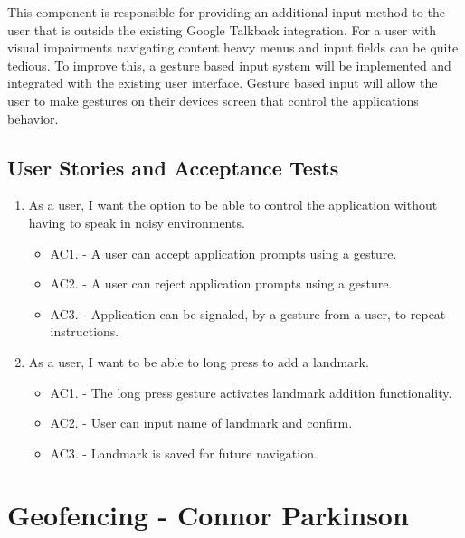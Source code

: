 \documentclass{scrreprt}
\begin{document}
This component is responsible for providing an additional input method to the user that
is outside the existing Google Talkback integration. For a user with visual impairments
navigating content heavy menus and input fields can be quite tedious. To improve this,
a gesture based input system will be implemented and integrated with the existing user
interface. Gesture based input will allow the user to make gestures on their devices
screen that control the applications behavior.

\subsection{User Stories and Acceptance Tests}

\begin{enumerate}
	\item As a user, I want the option to be able to control the application without having
to speak in noisy environments.
	
		\begin{itemize}
			\item AC1. - A user can accept application prompts using a gesture.

			\item AC2. - A user can reject application prompts using a gesture.

			\item AC3. - Application can be signaled, by a gesture from a user, to repeat instructions.
		\end{itemize}
	
	\item As a user, I want to be able to long press to add a landmark.
	
		\begin{itemize}
			\item AC1. - The long press gesture activates landmark addition functionality.

			\item AC2. - User can input name of landmark and confirm.

			\item AC3. - Landmark is saved for future navigation.
		\end{itemize}
\end{enumerate}

\pagebreak

\section{Geofencing - Connor Parkinson}
\end{document}
